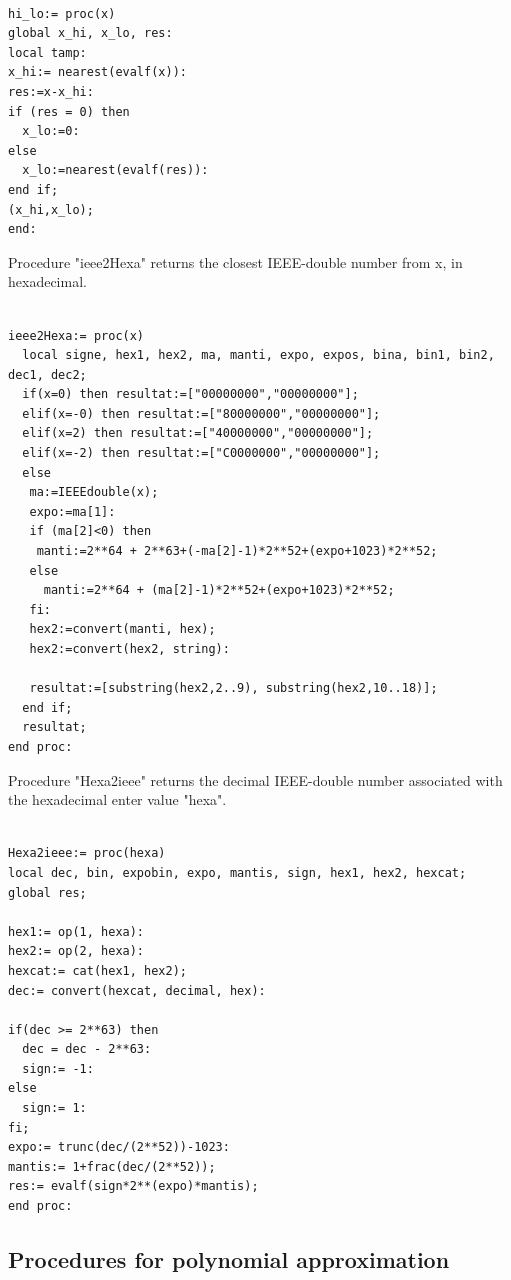 \begin{lstlisting}[caption={hi\_lo},firstnumber=1]

hi_lo:= proc(x)
global x_hi, x_lo, res:
local tamp:
x_hi:= nearest(evalf(x)):
res:=x-x_hi:
if (res = 0) then
  x_lo:=0:
else
  x_lo:=nearest(evalf(res)):
end if;
(x_hi,x_lo);
end:
\end{lstlisting}
\vspace{0.5cm}



Procedure "ieee2Hexa" returns the closest IEEE-double number from x, in hexadecimal.

\begin{lstlisting}[caption={ieee2Hexa},firstnumber=1]

ieee2Hexa:= proc(x)
  local signe, hex1, hex2, ma, manti, expo, expos, bina, bin1, bin2, dec1, dec2;
  if(x=0) then resultat:=["00000000","00000000"];
  elif(x=-0) then resultat:=["80000000","00000000"];
  elif(x=2) then resultat:=["40000000","00000000"];
  elif(x=-2) then resultat:=["C0000000","00000000"];
  else
   ma:=IEEEdouble(x);
   expo:=ma[1]:
   if (ma[2]<0) then 
    manti:=2**64 + 2**63+(-ma[2]-1)*2**52+(expo+1023)*2**52;
   else 
     manti:=2**64 + (ma[2]-1)*2**52+(expo+1023)*2**52;
   fi:
   hex2:=convert(manti, hex); 
   hex2:=convert(hex2, string):  
  
   resultat:=[substring(hex2,2..9), substring(hex2,10..18)];
  end if;
  resultat;
end proc:
\end{lstlisting}
\vspace{0.5cm}

Procedure "Hexa2ieee" returns the decimal IEEE-double number associated with the hexadecimal enter value "hexa".

\begin{lstlisting}[caption={Hexa2ieee},firstnumber=1]

Hexa2ieee:= proc(hexa)
local dec, bin, expobin, expo, mantis, sign, hex1, hex2, hexcat;
global res;

hex1:= op(1, hexa):
hex2:= op(2, hexa):
hexcat:= cat(hex1, hex2);
dec:= convert(hexcat, decimal, hex):

if(dec >= 2**63) then
  dec = dec - 2**63:
  sign:= -1:
else
  sign:= 1:
fi;  
expo:= trunc(dec/(2**52))-1023:
mantis:= 1+frac(dec/(2**52));
res:= evalf(sign*2**(expo)*mantis);
end proc:
\end{lstlisting}


\subsection{Procedures for polynomial approximation}


